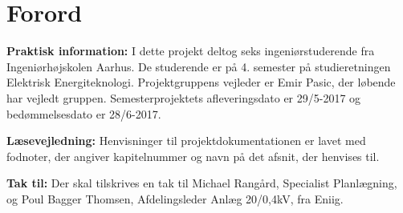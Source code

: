 
\section{Forord}

\textbf{Praktisk information:} I dette projekt deltog seks ingeniørstuderende fra Ingeniørhøjskolen Aarhus. De studerende er på 4. semester på studieretningen Elektrisk Energiteknologi. Projektgruppens vejleder er Emir Pasic, der løbende har vejledt gruppen. Semesterprojektets afleveringsdato er 29/5-2017 og bedømmelsesdato er 28/6-2017. 

\textbf{Læsevejledning:} Henvisninger til projektdokumentationen er lavet med fodnoter, der angiver kapitelnummer og navn på det afsnit, der henvises til. 

\textbf{Tak til:} Der skal tilskrives en tak til Michael Rangård, Specialist Planlægning, og Poul Bagger Thomsen, Afdelingsleder Anlæg 20/0,4kV, fra Eniig.

